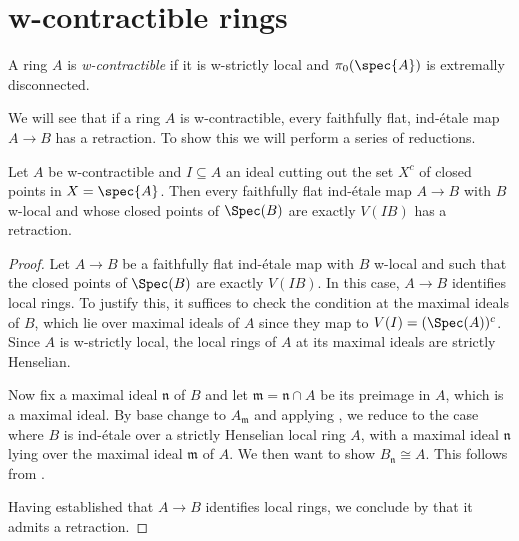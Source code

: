 \section{w-contractible rings}

\begin{definition}
    A ring \(A\) is \emph{w-contractible} if it is w-strictly local and $\pi_0(\spec{A})$
    is extremally disconnected.
    \label{def:w-contractible-ring}
    \leanok
\end{definition}

We will see that if a ring $A$ is w-contractible, every faithfully flat, ind-étale map $A \to B$ has a retraction. To show
this we will perform a series of reductions.

\begin{lemma}
    \label{thm:ind-etale-plus-c-has-retraction-if-w-contractible}
    \leanok
    Let $A$ be w-contractible and $I \subseteq A$ an ideal cutting out the set $X^c$ of closed points in $X = \spec{A}$.
    Then every faithfully flat ind-étale map \(A \to B\) with \(B\) w-local and
    whose closed points of \(\Spec (B)\) are exactly \(V(IB)\) has a retraction.
\end{lemma}

\begin{proof}
  Let \(A \to B\) be a faithfully flat ind-étale map with \(B\) w-local and such that the closed points of \(\Spec(B)\) are exactly \(V(IB)\). In this case, \(A \to B\) identifies local rings. To justify this, it suffices to check the condition at the maximal ideals of \(B\), which lie over maximal ideals of \(A\) since they map to \(V(I) = (\Spec(A))^c\). Since \(A\) is w-strictly local, the local rings of \(A\) at its maximal ideals are strictly Henselian.

  Now fix a maximal ideal \(\mathfrak{n}\) of \(B\) and let \(\mathfrak{m} = \mathfrak{n} \cap A\) be its preimage in \(A\), which is a maximal ideal. By base change to \(A_{\mathfrak{m}}\) and applying , we reduce to the case where \(B\) is ind-étale over a strictly Henselian local ring \(A\), with a maximal ideal \(\mathfrak{n}\) lying over the maximal ideal \(\mathfrak{m}\) of \(A\). We then want to show \(B_{\mathfrak{n}} \cong A\). This follows from .

  Having established that \(A \to B\) identifies local rings, we conclude by  that it admits a retraction.
\end{proof}

